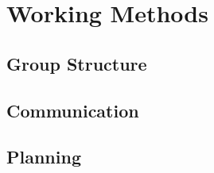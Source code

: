 \chapter{Working Methods}

\section{Group Structure}


\section{Communication}


\newpage
\section{Planning}

